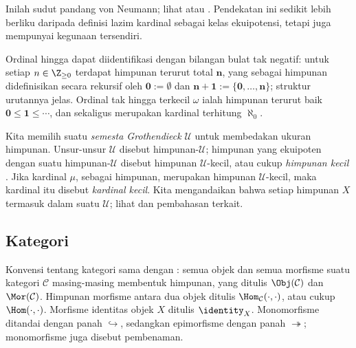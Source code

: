 Inilah sudut pandang von Neumann; lihat \cite[\S~1.2]{Li1} atau \cite{Je03}.
Pendekatan ini sedikit lebih berliku daripada definisi lazim kardinal sebagai
kelas ekuipotensi, tetapi juga mempunyai kegunaan tersendiri.

Ordinal hingga dapat diidentifikasi dengan bilangan bulat tak negatif: untuk
setiap $n \in \Z_{\geq 0}$ terdapat himpunan terurut total $\mathbf{n}$, yang
sebagai himpunan didefinisikan secara rekursif oleh
$\mathbf{0} := \emptyset$ dan
$\mathbf{n+1} := \{\mathbf{0}, \ldots, \mathbf{n}\}$; struktur urutannya jelas.
Ordinal tak hingga terkecil $\omega$ ialah himpunan terurut baik
$\mathbf{0} \leq \mathbf{1} \leq \cdots$, dan sekaligus merupakan kardinal
terhitung $\aleph_0$.

Kita memilih suatu \emph{semesta Grothendieck}
 $\mathcal{U}$ untuk membedakan ukuran himpunan.
Unsur-unsur $\mathcal{U}$ disebut himpunan-$\mathcal{U}$; himpunan yang
ekuipoten dengan suatu himpunan-$\mathcal{U}$ disebut himpunan
$\mathcal{U}$-kecil, atau cukup \emph{himpunan kecil}
. Jika kardinal $\mu$, sebagai himpunan,
merupakan himpunan $\mathcal{U}$-kecil, maka kardinal itu disebut \emph{kardinal
kecil}. Kita mengandaikan bahwa setiap himpunan
$X$ termasuk dalam suatu $\mathcal{U}$; lihat \cite[Asumsi~1.5.2]{Li1} dan
pembahasan terkait.

\subsection*{Kategori}

Konvensi tentang kategori sama dengan \cite[\S~1.5, Definisi~2.1.3]{Li1}:
semua objek dan semua morfisme suatu kategori $\mathcal{C}$ masing-masing
membentuk himpunan, yang ditulis $\Obj(\mathcal{C})$ dan $\Mor(\mathcal{C})$.
Himpunan morfisme antara dua objek ditulis
$\Hom_{\mathcal{C}}(\cdot, \cdot)$, atau cukup $\Hom(\cdot, \cdot)$. Morfisme
identitas objek $X$ ditulis $\identity_X$. Monomorfisme ditandai dengan panah
$\hookrightarrow$, sedangkan epimorfisme dengan panah $\twoheadrightarrow$;
monomorfisme juga disebut pembenaman.

